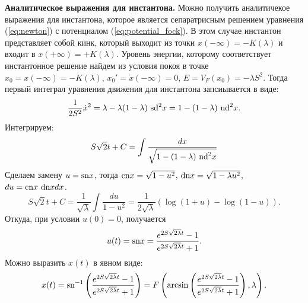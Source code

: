 \documentclass[12pt]{article}
\begin{document}
\textbf{Аналитическое выражения для инстантона.}
Можно получить аналитичекое выражения для инстантона, которое является сепаратрисным решением уравнения (\ref{eq:newton}) с потенциалом (\ref{eq:potential_fock}).
В этом случае инстантон представляет собой кинк, который выходит из точки $x(-\infty) = -K(\lambda)$ и входит в $x(+\infty) = +K(\lambda)$.
Уровень энергии, которому соответствует инстантонное решение найдем из условия покоя в точке $x_0 = x(-\infty) = -K(\lambda)$, $x_0' = \dot{x}(-\infty) = 0$, $E = V_F(x_0) = -\lambda S^2$.
Тогда первый интеграл уравнения движения для инстантона запсиывается в виде:
%
\begin{equation}
\frac{1}{2 S^2} \dot{x}^2 = \lambda - \lambda (1 - \lambda) ~\textrm{sd}^2 x = 1 - (1 - \lambda) ~\textrm{nd}^2 x.
\end{equation}
%
Интегрируем:
%
\begin{equation}
S \sqrt{2} t + C = \int\frac{dx}{\sqrt{1 - (1 - \lambda) ~\textrm{nd}^2 x}}
\end{equation}
%
Сделаем замену $u = \textrm{sn} x$, тогда $\textrm{cn} x = \sqrt{1 - u^2}$, $\textrm{dn} x = \sqrt{1 - \lambda u^2}$, $du = \textrm{cn} x ~\textrm{dn} x dx$.
%
\begin{equation}
S \sqrt{2} t + C = \frac{1}{\sqrt{\lambda}} \int \frac{du}{1 - u^2} = \frac{1}{2\sqrt{\lambda}} (\log(1 + u) - \log(1 - u)).
\end{equation}
%
Откуда, при условии $u(0) = 0$, получается
%
\begin{equation}
u(t) = \textrm{sn} x = \frac{e^{2S\sqrt{2 \lambda} t} - 1}{e^{2S\sqrt{2 \lambda} t} + 1}.
\end{equation}
%
Можно выразить $x(t)$ в явном виде:
%
\begin{equation}
x(t) = \textrm{sn}^{-1} \left( \frac{e^{2S\sqrt{2 \lambda} t} - 1}{e^{2S\sqrt{2 \lambda} t} + 1} \right) = F \left(\arcsin \left( \frac{e^{2S\sqrt{2 \lambda} t} - 1}{e^{2S\sqrt{2 \lambda} t} + 1} \right) , \lambda \right).
\label{eq:instanton_fock}
\end{equation}
%
\end{document}
